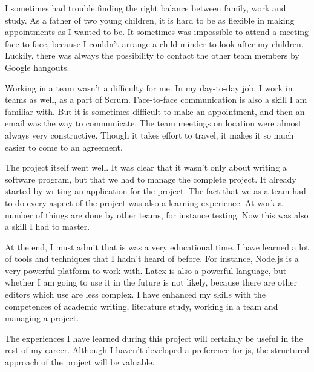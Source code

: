 I sometimes had trouble finding the right balance between family, work and study.
As a father of two young children, it is hard to be as flexible in making
appointments as I wanted to be.
It sometimes was impossible to attend a meeting face-to-face, because I couldn't
arrange a child-minder to look after my children.
Luckily, there was always the possibility to contact the other team members by
Google hangouts.

Working in a team wasn't a difficulty for me. In my day-to-day job, I work in
teams as well, as a part of Scrum. Face-to-face communication is also a skill I
am familiar with.
But it is sometimes difficult to make an appointment, and then an email was the
way to communicate. 
The team meetings on location were almost always very constructive.
Though it takes effort to travel, it makes it so much easier to come to an
agreement.

The project itself went well.
It was clear that it wasn't only about writing a software program, but that we
had to manage the complete project.
It already started by writing an application for the project.
The fact that we as a team had to do every aspect of the project was also a
learning experience. 
At work a number of things are done by other teams, for instance testing.
Now this was also a skill I had to master.

At the end, I must admit that is was a very educational time. I have learned a 
lot of tools and techniques that I hadn't heard of before.
For instance, Node.js is a very powerful platform to work with.
Latex is also a powerful language, but whether I am going to use it in the future is
not likely, because there are other editors which use are less complex.
I have enhanced my skills with the competences of academic writing, literature
study, working in a team and managing a project.

The experiences I have learned during this project will certainly be useful in
the rest of my career. Although I haven't developed a preference for \gls{js},
the structured approach of the project will be valuable.
